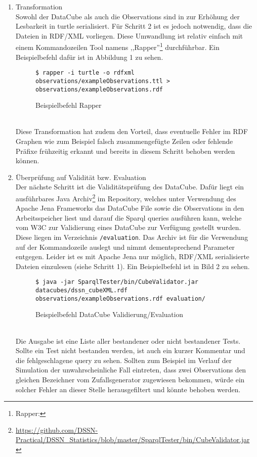\documentclass{article}
\begin{document}
\begin{enumerate}
	\item{Transformation\\
	Sowohl der DataCube als auch die Observations sind in zur Erhöhung der Lesbarkeit in turtle serialisiert. Für Schritt 2 ist es jedoch notwendig, dass die Dateien in RDF/XML vorliegen. Diese Umwandlung ist relativ einfach mit einem Kommandozeilen Tool namens ,,Rapper''\footnote{Rapper:} durchführbar. Ein Beispielbefehl dafür ist in Abbildung 1 zu sehen.\\
	\begin{figure}[h]
	\centering
	\texttt{\$ rapper -i turtle -o rdfxml observations/exampleObservations.ttl  > observations/exampleObservations.rdf}
	\caption{Beispielbefehl Rapper}
	\end{figure}
	}\\
	Diese Transformation hat zudem den Vorteil, dass eventuelle Fehler im RDF Graphen wie zum Beispiel falsch zusammengefügte Zeilen oder fehlende Präfixe frühzeitig erkannt und bereits in diesem Schritt behoben werden können.\\
	\item{Überprüfung auf Validität bzw. Evaluation\\
	Der nächste Schritt ist die Validitätsprüfung des DataCube. Dafür liegt ein ausführbares Java Archiv\footnote{\url{https://github.com/DSSN-Practical/DSSN_Statistics/blob/master/SparqlTester/bin/CubeValidator.jar}} im Repository, welches unter Verwendung des Apache Jena Frameworks das DataCube File sowie die Observations in den Arbeitsspeicher liest und darauf die Sparql queries ausführen kann, welche vom W3C zur Validierung eines DataCube zur Verfügung gestellt wurden. Diese liegen im Verzeichnis \texttt{/evaluation}. Das Archiv ist für die Verwendung auf der Kommandozeile auslegt und nimmt dementsprechend Parameter entgegen. Leider ist es mit Apache Jena nur möglich, RDF/XML serialisierte Dateien einzulesen (siehe Schritt 1). Ein Beispielbefehl ist in Bild 2 zu sehen.\\
	\begin{figure}[h]
	\centering
	\texttt{\$ java -jar SparqlTester/bin/CubeValidator.jar datacubes/dssn\_cubeXML.rdf observations/exampleObservations.rdf evaluation/}
	\caption{Beispielbefehl DataCube Validierung/Evaluation}
	\end{figure}\\
	Die Ausgabe ist eine Liste aller bestandener oder nicht bestandener Tests. Sollte ein Test nicht bestanden werden, ist auch ein kurzer Kommentar und die fehlgeschlagene query zu sehen. Sollten zum Beispiel im Verlauf der Simulation der unwahrscheinliche Fall eintreten, dass zwei Observations den gleichen Bezeichner vom Zufallsgenerator zugewiesen bekommen, würde ein solcher Fehler an dieser Stelle herausgefiltert und könnte behoben werden.
}
\end{enumerate}
\end{document}
